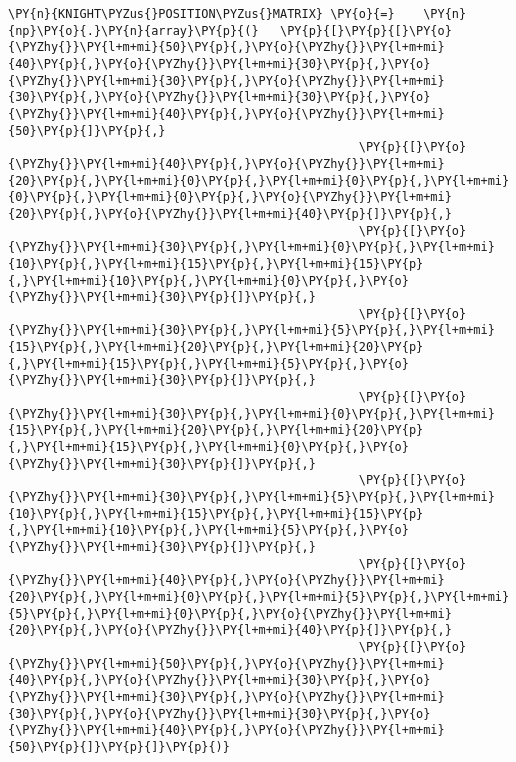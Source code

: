 \begin{Verbatim}[commandchars=\\\{\}]
         \PY{n}{KNIGHT\PYZus{}POSITION\PYZus{}MATRIX} \PY{o}{=}    \PY{n}{np}\PY{o}{.}\PY{n}{array}\PY{p}{(}   \PY{p}{[}\PY{p}{[}\PY{o}{\PYZhy{}}\PY{l+m+mi}{50}\PY{p}{,}\PY{o}{\PYZhy{}}\PY{l+m+mi}{40}\PY{p}{,}\PY{o}{\PYZhy{}}\PY{l+m+mi}{30}\PY{p}{,}\PY{o}{\PYZhy{}}\PY{l+m+mi}{30}\PY{p}{,}\PY{o}{\PYZhy{}}\PY{l+m+mi}{30}\PY{p}{,}\PY{o}{\PYZhy{}}\PY{l+m+mi}{30}\PY{p}{,}\PY{o}{\PYZhy{}}\PY{l+m+mi}{40}\PY{p}{,}\PY{o}{\PYZhy{}}\PY{l+m+mi}{50}\PY{p}{]}\PY{p}{,}
                                                 \PY{p}{[}\PY{o}{\PYZhy{}}\PY{l+m+mi}{40}\PY{p}{,}\PY{o}{\PYZhy{}}\PY{l+m+mi}{20}\PY{p}{,}\PY{l+m+mi}{0}\PY{p}{,}\PY{l+m+mi}{0}\PY{p}{,}\PY{l+m+mi}{0}\PY{p}{,}\PY{l+m+mi}{0}\PY{p}{,}\PY{o}{\PYZhy{}}\PY{l+m+mi}{20}\PY{p}{,}\PY{o}{\PYZhy{}}\PY{l+m+mi}{40}\PY{p}{]}\PY{p}{,}
                                                 \PY{p}{[}\PY{o}{\PYZhy{}}\PY{l+m+mi}{30}\PY{p}{,}\PY{l+m+mi}{0}\PY{p}{,}\PY{l+m+mi}{10}\PY{p}{,}\PY{l+m+mi}{15}\PY{p}{,}\PY{l+m+mi}{15}\PY{p}{,}\PY{l+m+mi}{10}\PY{p}{,}\PY{l+m+mi}{0}\PY{p}{,}\PY{o}{\PYZhy{}}\PY{l+m+mi}{30}\PY{p}{]}\PY{p}{,}
                                                 \PY{p}{[}\PY{o}{\PYZhy{}}\PY{l+m+mi}{30}\PY{p}{,}\PY{l+m+mi}{5}\PY{p}{,}\PY{l+m+mi}{15}\PY{p}{,}\PY{l+m+mi}{20}\PY{p}{,}\PY{l+m+mi}{20}\PY{p}{,}\PY{l+m+mi}{15}\PY{p}{,}\PY{l+m+mi}{5}\PY{p}{,}\PY{o}{\PYZhy{}}\PY{l+m+mi}{30}\PY{p}{]}\PY{p}{,}
                                                 \PY{p}{[}\PY{o}{\PYZhy{}}\PY{l+m+mi}{30}\PY{p}{,}\PY{l+m+mi}{0}\PY{p}{,}\PY{l+m+mi}{15}\PY{p}{,}\PY{l+m+mi}{20}\PY{p}{,}\PY{l+m+mi}{20}\PY{p}{,}\PY{l+m+mi}{15}\PY{p}{,}\PY{l+m+mi}{0}\PY{p}{,}\PY{o}{\PYZhy{}}\PY{l+m+mi}{30}\PY{p}{]}\PY{p}{,}
                                                 \PY{p}{[}\PY{o}{\PYZhy{}}\PY{l+m+mi}{30}\PY{p}{,}\PY{l+m+mi}{5}\PY{p}{,}\PY{l+m+mi}{10}\PY{p}{,}\PY{l+m+mi}{15}\PY{p}{,}\PY{l+m+mi}{15}\PY{p}{,}\PY{l+m+mi}{10}\PY{p}{,}\PY{l+m+mi}{5}\PY{p}{,}\PY{o}{\PYZhy{}}\PY{l+m+mi}{30}\PY{p}{]}\PY{p}{,}
                                                 \PY{p}{[}\PY{o}{\PYZhy{}}\PY{l+m+mi}{40}\PY{p}{,}\PY{o}{\PYZhy{}}\PY{l+m+mi}{20}\PY{p}{,}\PY{l+m+mi}{0}\PY{p}{,}\PY{l+m+mi}{5}\PY{p}{,}\PY{l+m+mi}{5}\PY{p}{,}\PY{l+m+mi}{0}\PY{p}{,}\PY{o}{\PYZhy{}}\PY{l+m+mi}{20}\PY{p}{,}\PY{o}{\PYZhy{}}\PY{l+m+mi}{40}\PY{p}{]}\PY{p}{,}
                                                 \PY{p}{[}\PY{o}{\PYZhy{}}\PY{l+m+mi}{50}\PY{p}{,}\PY{o}{\PYZhy{}}\PY{l+m+mi}{40}\PY{p}{,}\PY{o}{\PYZhy{}}\PY{l+m+mi}{30}\PY{p}{,}\PY{o}{\PYZhy{}}\PY{l+m+mi}{30}\PY{p}{,}\PY{o}{\PYZhy{}}\PY{l+m+mi}{30}\PY{p}{,}\PY{o}{\PYZhy{}}\PY{l+m+mi}{30}\PY{p}{,}\PY{o}{\PYZhy{}}\PY{l+m+mi}{40}\PY{p}{,}\PY{o}{\PYZhy{}}\PY{l+m+mi}{50}\PY{p}{]}\PY{p}{]}\PY{p}{)}
         

\end{Verbatim}
